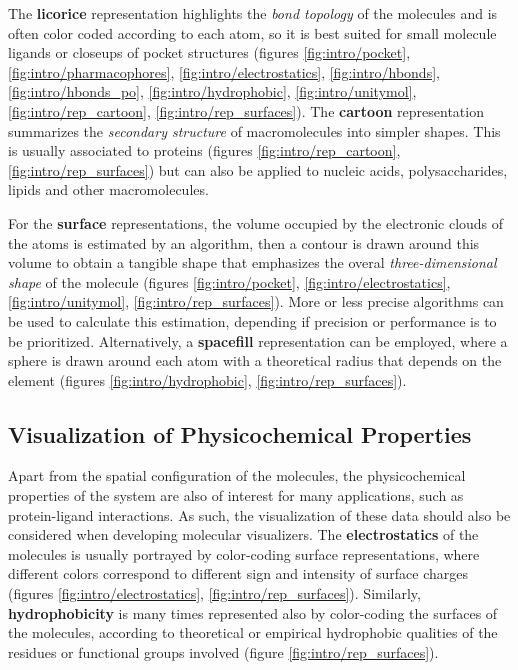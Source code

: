     The \textbf{licorice} representation highlights the \textit{bond topology} of the molecules and is often color coded according to each atom, so it is best suited for small molecule ligands or closeups of pocket structures (figures \ref{fig:intro/pocket}, \ref{fig:intro/pharmacophores}, \ref{fig:intro/electrostatics}, \ref{fig:intro/hbonds}, \ref{fig:intro/hbonds_po}, \ref{fig:intro/hydrophobic}, \ref{fig:intro/unitymol}, \ref{fig:intro/rep_cartoon}, \ref{fig:intro/rep_surfaces}). The \textbf{cartoon} representation summarizes the \textit{secondary structure} of macromolecules into simpler shapes. This is usually associated to proteins (figures \ref{fig:intro/rep_cartoon}, \ref{fig:intro/rep_surfaces}) but can also be applied to nucleic acids, polysaccharides, lipids and other macromolecules.

    For the \textbf{surface} representations, the volume occupied by the electronic clouds of the atoms is estimated by an algorithm, then a contour is drawn around this volume to obtain a tangible shape that emphasizes the overal \textit{three-dimensional shape} of the molecule (figures \ref{fig:intro/pocket}, \ref{fig:intro/electrostatics}, \ref{fig:intro/unitymol}, \ref{fig:intro/rep_surfaces}). More or less precise algorithms can be used to calculate this estimation, depending if precision or performance is to be prioritized. Alternatively, a \textbf{spacefill} representation can be employed, where a sphere is drawn around each atom with a theoretical radius that depends on the element (figures \ref{fig:intro/hydrophobic}, \ref{fig:intro/rep_surfaces}).

  \subsection{Visualization of Physicochemical Properties}
    Apart from the spatial configuration of the molecules, the physicochemical properties of the system are also of interest for many applications, such as protein-ligand interactions. As such, the visualization of these data should also be considered when developing molecular visualizers. The \textbf{electrostatics} of the molecules is usually portrayed by color-coding surface representations, where different colors correspond to different sign and intensity of surface charges (figures \ref{fig:intro/electrostatics}, \ref{fig:intro/rep_surfaces}). Similarly, \textbf{hydrophobicity} is many times represented also by color-coding the surfaces of the molecules, according to theoretical or empirical hydrophobic qualities of the residues or functional groups involved (figure \ref{fig:intro/rep_surfaces}).

